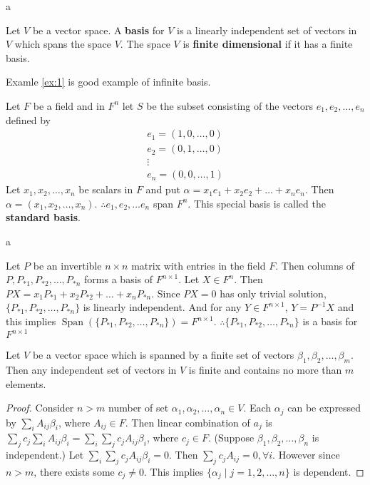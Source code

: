 \documentclass[8pt]{beamer}
\newcommand{\tb}[1]{\textbf{#1}}
\newcommand{\Span}[1]{\operatorname{Span}\!\left(#1\right)}
\begin{document}
\begin{frame}{a}
    \begin{definition}
        Let $V$ be a vector space. A \tb{basis} for $V$ is a linearly independent set of vectors in $V$ which spans the space $V$. The space $V$ is \tb{finite dimensional} if it has a finite basis.
    \end{definition}

    Examle \ref{ex:1} is good example of infinite basis.
    \begin{example}
        Let $F$ be a field and in $F^n$ let $S$ be the subset consisting of the vectors $e_1, e_2, \dots, e_n$ defined by 
        \[
        \begin{gathered}
            e_1 = (1, 0, \dots, 0) \\
            e_2 = (0, 1, \dots, 0) \\
            \vdots \\
            e_n = (0, 0, \dots, 1)
        \end{gathered}
        \]
        Let $x_1, x_2, \dots, x_n$ be scalars in $F$ and put $\alpha = x_1 e_1 + x_2 e_2 + \dots + x_n e_n$. Then $\alpha = (x_1, x_2, \dots, x_n)$. $\therefore e_1, e_2, \dots e_n$ span $F^n$. This special basis is called the \tb{standard basis}.
    \end{example}
\end{frame}

\begin{frame}{a}
    \begin{example}
        Let $P$ be an invertible $n\times n$ matrix with entries in the field $F$. Then columns of $P, P_{*1}, P_{*2}, \dots, P_{*n}$ forms a basis of $F^{n \times 1}$. Let $X \in F^n$. Then $PX = x_1 P_{*1} + x_2 P_{*2} + \dots + x_n P_{*n}$. Since $PX = 0$ has only trivial solution, $\{ P_{*1}, P_{*2}, \dots, P_{*n} \}$ is linearly independent. And for any $Y \in F^{n\times 1}$, $Y = P^{-1}X$ and this implies $\Span{\{ P_{*1}, P_{*2}, \dots, P_{*n} \}} = F^{n \times 1}$. $\therefore \{ P_{*1}, P_{*2}, \dots, P_{*n} \} $ is a basis for $F^{n\times 1}$
    \end{example}

    \begin{theorem}\label{th:2}
        Let $V$ be a vector space which is spanned by a finite set of vectors $\beta_1, \beta_2, \dots, \beta_m$. Then any independent set of vectors in $V$ is finite and contains no more than $m$ elements.
    \end{theorem}
    \begin{proof}
        Consider $n>m$ number of set $\alpha_1, \alpha_2, \dots, \alpha_{n} \in V$. Each $\alpha_j$ can be expressed by $\sum_{i} A_{ij} \beta_i$, where $A_{ij} \in F$. Then linear combination of $a_j$ is  $\sum_{j} c_j \sum_i A_{ij} \beta_i = \sum_{i}\sum_{j} c_j A_{ij} \beta_i$, where $c_j \in F$. 
        (Suppose $\beta_1, \beta_2, \dots, \beta_n$ is independent.) Let $ \sum_i \sum_j c_j A_{ij} \beta_i = 0$. Then $\sum_j c_j A_{ij} = 0, \forall i$. However since $n>m$, there exists some $c_j \neq 0$. This implies $\{\alpha_j \mid j=1, 2, \dots, n\}$ is dependent.
    \end{proof}
\end{frame}
\end{document}
